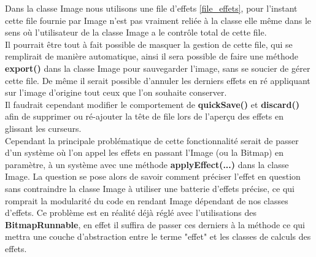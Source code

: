 Dans la classe Image nous utilisons une file d'effets \ref{file_effets}, pour l'instant cette file fournie par Image n'est pas vraiment reliée à la classe elle même dans le sens où l'utilisateur de la classe Image a le contrôle total de cette file.
\\
Il pourrait être tout à fait possible de masquer la gestion de cette file, qui se remplirait de manière automatique, ainsi il sera possible de faire une méthode \textbf{export()} dans la classe Image pour sauvegarder l'image, sans se soucier de gérer cette file. De même il serait possible d'annuler les derniers effets en ré appliquant sur l'image d'origine tout ceux que l'on souhaite conserver.
\\
Il faudrait cependant modifier le comportement de \textbf{quickSave()} et \textbf{discard()} afin de supprimer ou ré-ajouter la tête de file lors de l'aperçu des effets en glissant les curseurs.
\\
Cependant la principale problématique de cette fonctionnalité serait de passer d'un système où l'on appel les effets en passant l'Image (ou la Bitmap) en paramètre, à un système avec une méthode \textbf{applyEffect(...)} dans la classe Image. La question se pose alors de savoir comment préciser l'effet en question sans contraindre la classe Image à utiliser une batterie d'effets précise, ce qui romprait la modularité du code en rendant Image dépendant de nos classes d'effets. Ce problème est en réalité déjà réglé avec l'utilisations des \textbf{BitmapRunnable}, en effet il suffira de passer ces derniers à la méthode ce qui mettra une couche d'abstraction entre le terme "effet" et les classes de calculs des effets.
